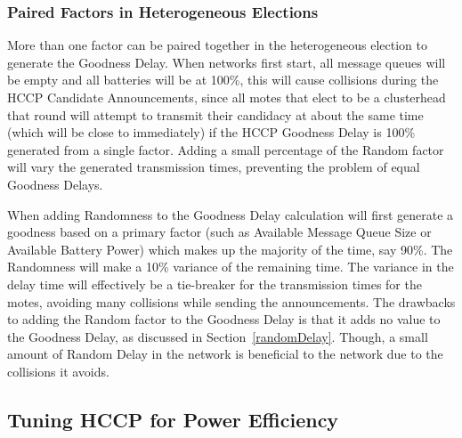 
\subsubsection{Paired Factors in Heterogeneous Elections}
More than one factor can be paired together in the heterogeneous election to generate the Goodness
Delay. When networks first start, all message queues will be empty and all
batteries will be at 100\%, this will cause collisions during the 
HCCP Candidate Announcements, since all motes that elect to 
be a clusterhead that round will attempt to transmit their 
candidacy at about the same time (which will be close to immediately) if
the HCCP Goodness Delay is 100\% generated from a single factor. 
Adding a small percentage of the Random factor  will vary the 
generated transmission times, preventing the problem of equal Goodness Delays.

When adding Randomness to the Goodness Delay calculation will first
generate a goodness based on a primary factor (such as Available Message Queue Size or
Available Battery Power) which makes up the majority of the time, say 90\%. 
The Randomness will make a 10\% variance of the remaining time. 
The variance in the delay time will effectively be a tie-breaker for the transmission times
for the motes, avoiding many collisions while sending the announcements. The drawbacks to adding 
the Random factor to the Goodness Delay is that it adds no value to the Goodness Delay, as discussed
in Section~\ref{randomDelay}. Though, a small amount of Random Delay in the network 
is beneficial to the network due to the collisions it avoids. 


\subsection {Tuning HCCP for Power Efficiency}
\label{simTuning}

